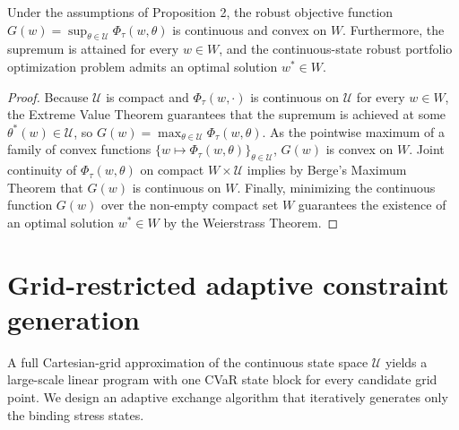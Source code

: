 \documentclass[smallextended]{svjour3}
\begin{document}
\begin{theorem}
Under the assumptions of Proposition 2, the robust objective function $G(w) = \sup_{\theta \in \mathcal{U}} \Phi_\tau(w, \theta)$ is continuous and convex on $W$. Furthermore, the supremum is attained for every $w \in W$, and the continuous-state robust portfolio optimization problem admits an optimal solution $w^* \in W$.
\end{theorem}

\begin{proof}
Because $\mathcal{U}$ is compact and $\Phi_\tau(w, \cdot)$ is continuous on $\mathcal{U}$ for every $w \in W$, the Extreme Value Theorem guarantees that the supremum is achieved at some $\theta^*(w) \in \mathcal{U}$, so $G(w) = \max_{\theta \in \mathcal{U}} \Phi_\tau(w, \theta)$. As the pointwise maximum of a family of convex functions $\{w \mapsto \Phi_\tau(w, \theta)\}_{\theta \in \mathcal{U}}$, $G(w)$ is convex on $W$. Joint continuity of $\Phi_\tau(w, \theta)$ on compact $W \times \mathcal{U}$ implies by Berge's Maximum Theorem that $G(w)$ is continuous on $W$. Finally, minimizing the continuous function $G(w)$ over the non-empty compact set $W$ guarantees the existence of an optimal solution $w^* \in W$ by the Weierstrass Theorem.
\end{proof}

\section{Grid-restricted adaptive constraint generation}
A full Cartesian-grid approximation of the continuous state space $\mathcal{U}$ yields a large-scale linear program with one CVaR state block for every candidate grid point. We design an adaptive exchange algorithm that iteratively generates only the binding stress states.
\end{document}
